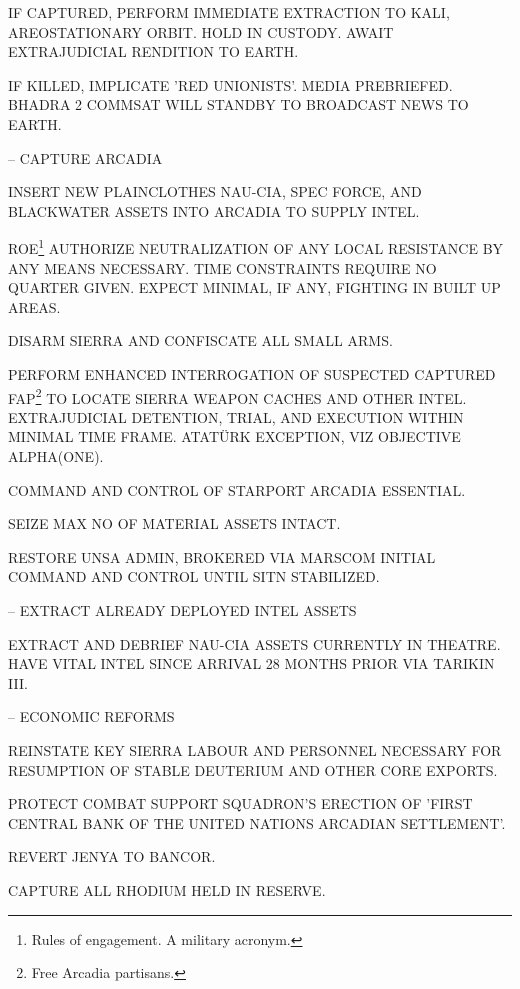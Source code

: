     \startitemize[n]
    \item IF CAPTURED, PERFORM IMMEDIATE EXTRACTION TO KALI, AREOSTATIONARY ORBIT. HOLD IN CUSTODY. AWAIT EXTRAJUDICIAL RENDITION TO EARTH.
    \item IF KILLED, IMPLICATE 'RED UNIONISTS'. MEDIA PREBRIEFED. BHADRA 2 COMMSAT WILL STANDBY TO BROADCAST NEWS TO EARTH.
    \stopitemize

\item {} -- CAPTURE ARCADIA
    \startitemize[n]
    \item INSERT NEW PLAINCLOTHES NAU-CIA, SPEC FORCE, AND BLACKWATER ASSETS INTO ARCADIA TO SUPPLY INTEL.
    \item ROE\footnote{Rules of engagement. A military acronym.} AUTHORIZE NEUTRALIZATION OF ANY LOCAL RESISTANCE BY ANY MEANS NECESSARY. TIME CONSTRAINTS REQUIRE NO QUARTER GIVEN. EXPECT MINIMAL, IF ANY, FIGHTING IN BUILT UP AREAS.
    \item DISARM SIERRA AND CONFISCATE ALL SMALL ARMS.
    \item PERFORM ENHANCED INTERROGATION OF SUSPECTED CAPTURED FAP\footnote{Free Arcadia partisans.} TO LOCATE SIERRA WEAPON CACHES AND OTHER INTEL. EXTRAJUDICIAL DETENTION, TRIAL, AND EXECUTION WITHIN MINIMAL TIME FRAME. ATATÜRK EXCEPTION, VIZ OBJECTIVE ALPHA(ONE).
    \item COMMAND AND CONTROL OF STARPORT ARCADIA ESSENTIAL.
    \item SEIZE MAX NO OF MATERIAL ASSETS INTACT.
    \item RESTORE UNSA ADMIN, BROKERED VIA MARSCOM INITIAL COMMAND AND CONTROL UNTIL SITN STABILIZED.
    \stopitemize

\item {} -- EXTRACT ALREADY DEPLOYED INTEL ASSETS
    \startitemize[n]
    \item EXTRACT AND DEBRIEF NAU-CIA ASSETS CURRENTLY IN THEATRE. HAVE VITAL INTEL SINCE ARRIVAL 28 MONTHS PRIOR VIA TARIKIN III.
    \stopitemize

\item {} -- ECONOMIC REFORMS
    \startitemize[n]
    \item REINSTATE KEY SIERRA LABOUR AND PERSONNEL NECESSARY FOR RESUMPTION OF STABLE DEUTERIUM AND OTHER CORE EXPORTS.
    \item PROTECT COMBAT SUPPORT SQUADRON'S ERECTION OF 'FIRST CENTRAL BANK OF THE UNITED NATIONS ARCADIAN SETTLEMENT'.
    \item REVERT JENYA TO BANCOR.
    \item CAPTURE ALL RHODIUM HELD IN RESERVE.
    \stopitemize

